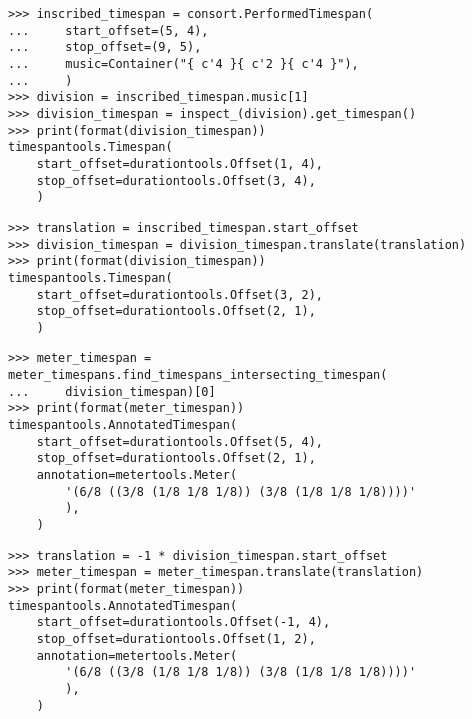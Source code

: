 \begin{abjadbookoutput}
\begin{singlespacing}
\vspace{-0.5\baselineskip}
\begin{verbatim}
>>> inscribed_timespan = consort.PerformedTimespan(
...     start_offset=(5, 4),
...     stop_offset=(9, 5),
...     music=Container("{ c'4 }{ c'2 }{ c'4 }"),
...     )
>>> division = inscribed_timespan.music[1]
>>> division_timespan = inspect_(division).get_timespan()
>>> print(format(division_timespan))
timespantools.Timespan(
    start_offset=durationtools.Offset(1, 4),
    stop_offset=durationtools.Offset(3, 4),
    )
\end{verbatim}
\begin{verbatim}
>>> translation = inscribed_timespan.start_offset
>>> division_timespan = division_timespan.translate(translation)
>>> print(format(division_timespan))
timespantools.Timespan(
    start_offset=durationtools.Offset(3, 2),
    stop_offset=durationtools.Offset(2, 1),
    )
\end{verbatim}
\begin{verbatim}
>>> meter_timespan = meter_timespans.find_timespans_intersecting_timespan(
...     division_timespan)[0]
>>> print(format(meter_timespan))
timespantools.AnnotatedTimespan(
    start_offset=durationtools.Offset(5, 4),
    stop_offset=durationtools.Offset(2, 1),
    annotation=metertools.Meter(
        '(6/8 ((3/8 (1/8 1/8 1/8)) (3/8 (1/8 1/8 1/8))))'
        ),
    )
\end{verbatim}
\begin{verbatim}
>>> translation = -1 * division_timespan.start_offset
>>> meter_timespan = meter_timespan.translate(translation)
>>> print(format(meter_timespan))
timespantools.AnnotatedTimespan(
    start_offset=durationtools.Offset(-1, 4),
    stop_offset=durationtools.Offset(1, 2),
    annotation=metertools.Meter(
        '(6/8 ((3/8 (1/8 1/8 1/8)) (3/8 (1/8 1/8 1/8))))'
        ),
    )
\end{verbatim}
\end{singlespacing}
\end{abjadbookoutput}

